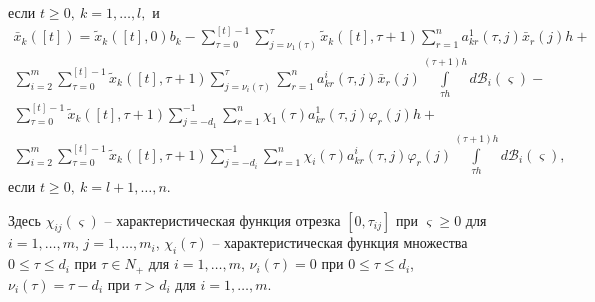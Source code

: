 если $t\geq 0,  \ k = 1, \dots ,l,$ и
$$
\begin{array}{crl}
 \bar x_k([t]) = \tilde
x_k([t],0)b_k - \sum \limits _{\tau=0 }^{[t]-1}\sum \limits _{j=\nu
_1 (\tau)}^{\tau}\tilde x_k([t],\tau + 1)\sum \limits _{r=1 }^n
a^{1}_{kr}(\tau,j)\bar x_r(j)h + \\
\sum \limits _{i=2}^{m}\sum \limits _{\tau=0 }^{[t]-1}\tilde
x_k([t],\tau + 1)\sum \limits _{j=\nu _i (\tau) }^{\tau} \sum
\limits _{r=1 }^n a^{i}_{kr}(\tau,j) \bar x_r(j)\int \limits _{\tau
h}^{(\tau +1)h}d\mathcal B_i(\varsigma)  - \\
\sum \limits _{\tau=0 }^{[t]-1}\tilde x_k([t],\tau + 1)\sum \limits
_{j=- d_1}^{-1}\sum \limits _{r=1 }^n \chi _1
(\tau)a^{1}_{kr}(\tau,j)\varphi _r(j)h +\\
 \sum \limits _{i=2}^{m}\sum
\limits _{\tau=0 }^{[t]-1}\tilde x_k([t],\tau + 1)\sum \limits
_{j=-d_i }^{-1} \sum \limits _{r=1 }^n \chi _i
(\tau)a^{i}_{kr}(\tau,j)\varphi _r(j) \int \limits _{\tau h}^{(\tau
+1)h}d\mathcal B_i(\varsigma ),
\end{array}
$$
если $t\geq 0,  \  k = l+1, \dots,n$.

Здесь  $\chi _{ij} (\varsigma)$ -- характеристическая функция отрезка
$[0,\tau _{ij}]$ при $\varsigma \geq 0$ для $i= 1,\dots,m$, $j=
1,\dots,m_i$, $\chi _i (\tau)$ -- характеристическая функция множества
$0 \le \tau \le d_i$  при $\tau \in N_+$  для $i= 1,\dots,m$, $\nu _i
(\tau) = 0$ при $0 \le \tau \le d_i$,  $\nu _i (\tau) = \tau - d_i$
при $\tau > d_i$ для
 $i= 1,\dots,m$.

